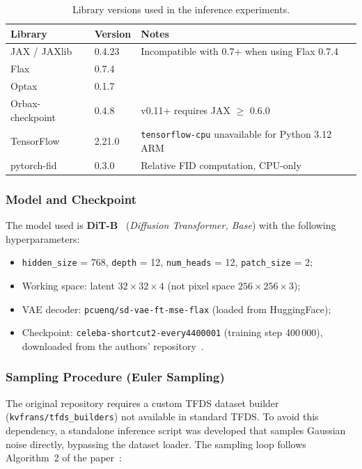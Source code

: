 \begin{table}[h]
\centering
\caption{Library versions used in the inference experiments.}
\label{tab:env}
\begin{tabular}{lll}
\toprule
\textbf{Library} & \textbf{Version} & \textbf{Notes} \\
\midrule
JAX / JAXlib     & 0.4.23 & Incompatible with 0.7+ when using Flax 0.7.4 \\
Flax             & 0.7.4  & \\
Optax            & 0.1.7  & \\
Orbax-checkpoint & 0.4.8  & v0.11+ requires JAX $\geq$ 0.6.0 \\
TensorFlow       & 2.21.0 & \texttt{tensorflow-cpu} unavailable for Python 3.12 ARM \\
pytorch-fid      & 0.3.0  & Relative FID computation, CPU-only \\
\bottomrule
\end{tabular}
\end{table}

\subsubsection{Model and Checkpoint}

The model used is \textbf{DiT-B}~\cite{peebles2023scalable}
(\textit{Diffusion Transformer, Base}) with the following hyperparameters:
\begin{itemize}
    \item \texttt{hidden\_size} = 768, \texttt{depth} = 12,
          \texttt{num\_heads} = 12, \texttt{patch\_size} = 2;
    \item Working space: latent $32 \times 32 \times 4$
          (not pixel space $256 \times 256 \times 3$);
    \item VAE decoder: \texttt{pcuenq/sd-vae-ft-mse-flax}
          (loaded from HuggingFace);
    \item Checkpoint: \texttt{celeba-shortcut2-every4400001}
          (training step 400\,000), downloaded from the authors'
          repository~\cite{Frans2025}.
\end{itemize}

\subsubsection{Sampling Procedure (Euler Sampling)}

The original repository requires a custom TFDS dataset builder
(\texttt{kvfrans/tfds\_builders}) not available in standard TFDS.
To avoid this dependency, a standalone inference script was developed that
samples Gaussian noise directly, bypassing the dataset loader.
The sampling loop follows Algorithm~2 of the paper~\cite{Frans2025}:

